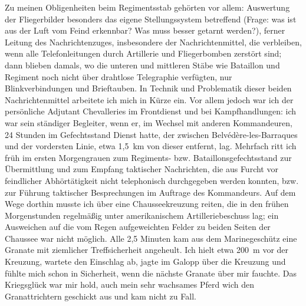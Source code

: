 \documentclass[a5paper,pagesize,10pt,twoside=true]{scrbook}
\begin{document}
Zu meinen Obligenheiten beim Regimentsstab gehörten vor allem: Auswertung der Fliegerbilder besonders das eigene Stellungssystem betreffend (Frage: was ist aus der Luft vom Feind erkennbar? Was muss besser getarnt werden?), ferner Leitung des Nachrichtenzuges, insbesondere der Nachrichtenmittel, die verbleiben, wenn alle Telefonleitungen durch Artillerie und Fliegerbomben zerstört sind; dann blieben damals, wo die unteren und mittleren Stäbe wie Bataillon und Regiment noch nicht über drahtlose Telegraphie verfügten, nur Blinkverbindungen und Brieftauben. In Technik und Problematik dieser beiden Nachrichtenmittel arbeitete ich mich in Kürze ein. Vor allem jedoch war ich der persönliche Adjutant Chevalleries im Frontdienst und bei Kampfhandlungen: ich war sein ständiger Begleiter, wenn er, im Wechsel mit anderen Kommandeuren, 24 Stunden im Gefechtsstand Dienst hatte, der zwischen Belvédère-les-Barraques und der vordersten Linie, etwa 1,5~km von dieser entfernt, lag. Mehrfach ritt ich früh im ersten Morgengrauen zum Regiments- bzw. Bataillonsgefechtsstand zur Übermittlung und zum Empfang taktischer Nachrichten, die aus Furcht vor feindlicher Abhörtätigkeit nicht telephonisch durchgegeben werden konnten, bzw. zur Führung taktischer Besprechungen im Auftrage des Kommandeurs. Auf dem Wege dorthin musste ich über eine Chausseekreuzung reiten, die in den frühen Morgenstunden regelmäßig unter amerikanischem Artilleriebeschuss lag; ein Ausweichen auf die vom Regen aufgeweichten Felder zu beiden Seiten der Chaussee war nicht möglich. Alle 2,5 Minuten kam aus dem Marinegeschütz eine Granate mit ziemlicher Treffsicherheit angeheult. Ich hielt etwa 200~m vor der Kreuzung, wartete den Einschlag ab, jagte im Galopp über die Kreuzung und fühlte mich schon in Sicherheit, wenn die nächste Granate über mir fauchte. Das Kriegsglück war mir hold, auch mein sehr wachsames Pferd wich den Granattrichtern geschickt aus und kam nicht zu Fall.
\end{document}
